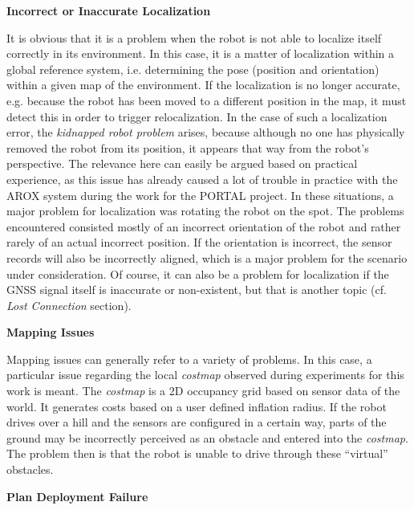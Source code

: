 \documentclass[english, master, utf8]{base/thesis_KBS}
\begin{document}
\noindent
\textbf{Incorrect or Inaccurate Localization}\newline

\noindent
It is obvious that it is a problem when the robot is not able to localize itself correctly in its environment.
In this case, it is a matter of localization within a global reference system, i.e. determining the pose (position and orientation) within a given map of the environment.
If the localization is no longer accurate, e.g. because the robot has been moved to a different position in the map, it must detect this in order to
trigger relocalization. In the case of such a localization error, the \textit{kidnapped robot problem} arises, because although no one has 
physically removed the robot from its position, it appears that way from the robot's perspective. \cite{Hertzberg:2012}
The relevance here can easily be argued based on practical experience, as this issue has already caused a lot of trouble in practice with the AROX system during 
the work for the PORTAL project. In these situations, a major problem for localization was rotating the robot on the spot.
The problems encountered consisted mostly of an incorrect orientation of the robot and rather rarely of an actual incorrect position.
If the orientation is incorrect, the sensor records will also be incorrectly aligned, which is a major problem for the scenario under consideration.
Of course, it can also be a problem for localization if the GNSS signal itself is inaccurate or non-existent, but that is another topic (cf. \textit{Lost Connection} section).\newline

\noindent
\textbf{Mapping Issues}\newline

\noindent
Mapping issues can generally refer to a variety of problems. In this case, a particular issue regarding the local \textit{costmap} observed during experiments for this work is meant.
The \textit{costmap} is a 2D occupancy grid based on sensor data of the world. It generates costs based on a user defined inflation radius.
If the robot drives over a hill and the sensors are configured in a certain way, parts of the ground may be incorrectly perceived as an obstacle and entered into the \textit{costmap}.
The problem then is that the robot is unable to drive through these ``virtual'' obstacles. \newline

\noindent
\textbf{Plan Deployment Failure}\newline
\end{document}
